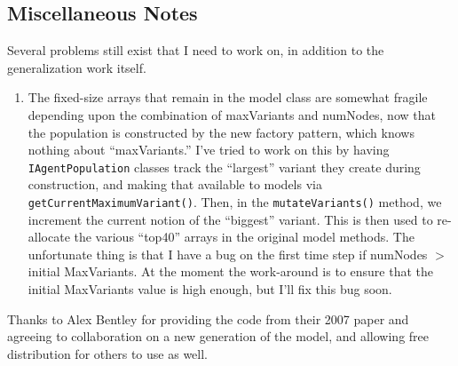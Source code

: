 \documentclass{kluwer-mem-copyright}
\begin{document}
\begin{article}
\subsection{Miscellaneous Notes}
Several problems still exist that I need to work on, in addition to the
generalization work itself.  
\begin{enumerate}
  \item The fixed-size arrays that remain in the model class are somewhat
  fragile depending upon the combination of maxVariants and numNodes, now that
  the population is constructed by the new factory pattern, which knows nothing
  about ``maxVariants.''  I've tried to work on this by having
  \texttt{IAgentPopulation} classes track the ``largest'' variant they create
  during construction, and making that available to models via
  \texttt{getCurrentMaximumVariant()}.  Then, in the \texttt{mutateVariants()} 
  method, we increment the current notion of the ``biggest'' variant.  This is
  then used to re-allocate the various ``top40'' arrays in the original model
  methods.  The unfortunate thing is that I have a bug on the first time step if
  numNodes \( > \) initial MaxVariants.  At the moment the work-around is to
  ensure
  that the initial MaxVariants value is high enough, but I'll fix this bug soon.
\end{enumerate}

\acknowledgements
Thanks to Alex Bentley for providing the code from their 2007 paper and agreeing
to collaboration on a new generation of the model, and allowing free
distribution for others to use as well.  
\end{article}
\end{document}
